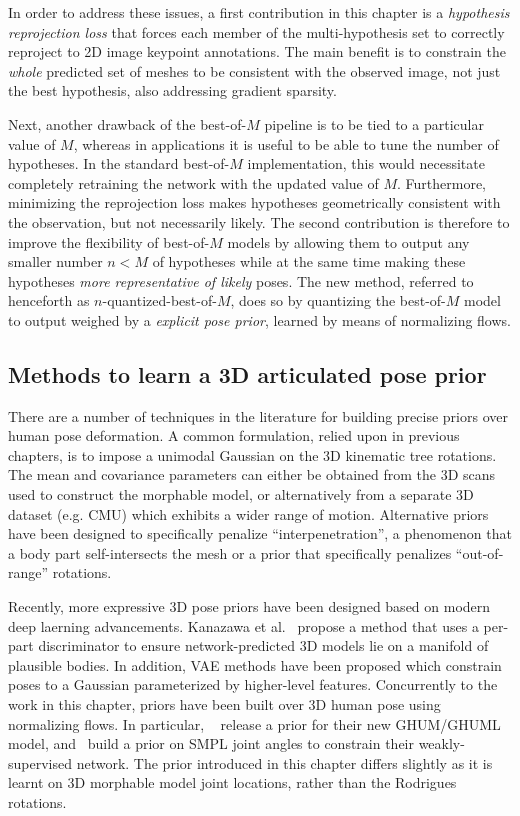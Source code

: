 In order to address these issues, a first contribution in this chapter is a \emph{hypothesis reprojection loss} that forces each member of the multi-hypothesis set to correctly reproject to 2D image keypoint annotations.
The main benefit is to constrain the \emph{whole} predicted set of meshes to be consistent with the observed image, not just the best hypothesis, also addressing gradient sparsity.

Next, another drawback of the best-of-{$M$} pipeline is to be tied to a particular value of $M$, whereas in applications it is useful to be able to tune the number of hypotheses. In the standard best-of-{$M$} implementation, this would necessitate completely retraining the network with the updated value of $M$. 
Furthermore, minimizing the reprojection loss makes hypotheses geometrically consistent with the observation, but not necessarily likely.
The second contribution is therefore to improve the flexibility of best-of-$M$ models by allowing them to output any smaller number $n<M$ of hypotheses while at the same time making these hypotheses \emph{more representative of likely} poses.
The new method, referred to henceforth as $n$-quantized-best-of-$M$, does so by quantizing the best-of-$M$ model to output weighed by a \emph{explicit pose prior}, learned by means of normalizing flows.

\subsection{Methods to learn a 3D articulated pose prior}


There are a number of techniques in the literature for building precise priors over human pose deformation. A common formulation, relied upon in previous chapters, is to impose a unimodal Gaussian on the 3D kinematic tree rotations. The mean and covariance parameters can either be obtained from the 3D scans used to construct the morphable model, or alternatively from a separate 3D dataset (e.g. CMU) which exhibits a wider range of motion. Alternative priors have been designed to specifically penalize ``interpenetration'', a phenomenon that a body part self-intersects the mesh or a prior that specifically penalizes ``out-of-range'' rotations. 

Recently, more expressive 3D pose priors have been designed based on modern deep laerning advancements. Kanazawa et al.~\cite{xxx} propose a method that uses a per-part discriminator to ensure network-predicted 3D models lie on a manifold of plausible bodies. In addition, VAE methods have been proposed which constrain poses to a Gaussian parameterized by higher-level features. %
Concurrently to the work in this chapter, priors have been built over 3D human pose using normalizing flows. In particular, ~\citet{xu-2020-cvpr} release a prior for their new GHUM/GHUML model, and~\citet{weakly-supervised-normflow} build a prior on SMPL joint angles to constrain their weakly-supervised network. The prior introduced in this chapter differs slightly as it is learnt on 3D morphable model joint locations, rather than the Rodrigues rotations.

